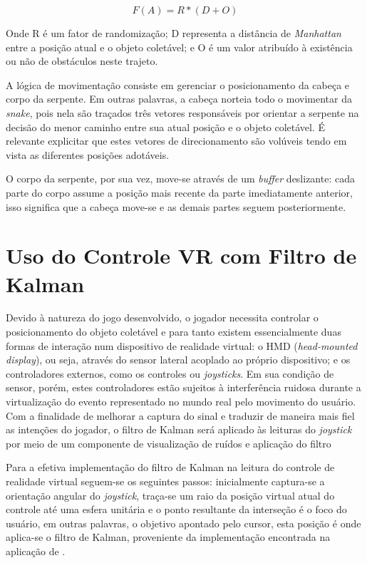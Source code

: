 \documentclass{vgtc}                          %
\begin{document}
\begin{equation}
F(A) = R * (D + O)
\label{equation11}
\end{equation}

Onde R é um fator de randomização; D representa a distância de \textit{Manhattan} entre a posição atual e o objeto coletável; e O é um valor atribuído à existência ou não de obstáculos neste trajeto.

A lógica de movimentação consiste em gerenciar o posicionamento da cabeça e corpo da serpente.  Em outras palavras, a cabeça norteia todo o movimentar da \textit{snake}, pois nela são traçados três vetores responsáveis por orientar a serpente na decisão do menor caminho entre sua atual posição e o objeto coletável. É relevante explicitar que estes vetores de direcionamento são volúveis tendo em vista as diferentes posições adotáveis.

O corpo da serpente, por sua vez, move-se através de um \textit{buffer} deslizante: cada parte do corpo assume a posição mais recente da parte imediatamente anterior, isso significa que a cabeça move-se e as demais partes seguem posteriormente.

\section{Uso do Controle VR com Filtro de Kalman} \label{sec:gearvrcontroller}

Devido à natureza do jogo desenvolvido, o jogador necessita controlar o posicionamento do objeto coletável e para tanto existem essencialmente duas formas de interação num dispositivo de realidade virtual: o HMD (\textit{head-mounted display}), ou seja, através do sensor lateral acoplado ao próprio dispositivo; e os controladores externos, como os controles ou \textit{joysticks}. Em sua condição de sensor, porém, estes controladores estão sujeitos à interferência ruidosa durante a virtualização do evento representado no mundo real pelo movimento do usuário. Com a finalidade de melhorar a captura do sinal e traduzir de maneira mais fiel as intenções do jogador, o filtro de Kalman será aplicado às leituras do \textit{joystick} por meio de um componente de visualização de ruídos e aplicação do filtro

Para a efetiva implementação do filtro de Kalman na leitura do controle de realidade virtual seguem-se os seguintes passos: inicialmente captura-se a orientação angular do \textit{joystick}, traça-se um raio da posição virtual atual do controle até uma esfera unitária e o ponto resultante da interseção é o foco do usuário, em outras palavras, o objetivo apontado pelo cursor, esta posição é onde aplica-se o filtro de Kalman, proveniente da implementação encontrada na aplicação de \cite{KalmanComponent}.
\end{document}
